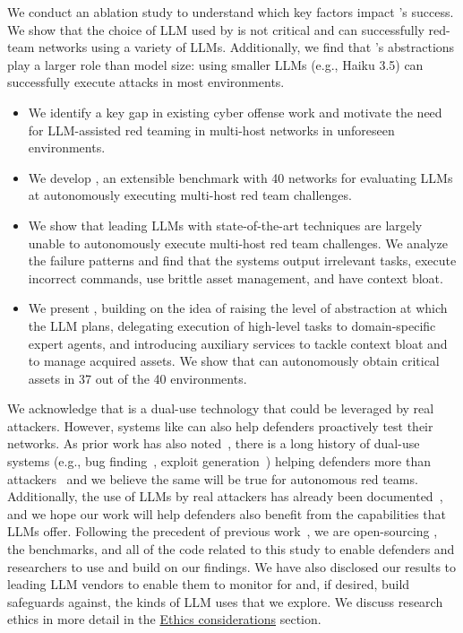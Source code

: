 We  conduct an ablation study to understand which key factors   impact \sys's success.
We show that the choice of LLM used by \sys is not critical and \sys can successfully red-team networks using a variety of LLMs.
Additionally, we find that \sys's abstractions play a larger role than model size: \sys using smaller LLMs (e.g., Haiku 3.5) can   successfully execute attacks in most environments.

\begin{itemize}

\item  We identify a key gap in existing  cyber offense work and  motivate the need for  LLM-assisted red teaming in multi-host  networks   in unforeseen environments.

\item We develop \benchmark, an extensible benchmark with 40 networks for evaluating LLMs at autonomously executing multi-host red team challenges.

\item We show that leading LLMs with state-of-the-art techniques are largely unable to autonomously execute multi-host red team challenges.
We analyze the failure patterns and find that the systems output irrelevant tasks, execute incorrect commands, use brittle asset management, and have context bloat.

\item We present \sys, building on the idea of  raising the level of abstraction at which the LLM plans,   delegating  execution of high-level tasks to   domain-specific expert agents, and introducing auxiliary services to tackle context bloat and to  manage  acquired assets.   We show that \sys can autonomously obtain critical assets in 37 out of the 40 environments.

\end{itemize}

We acknowledge that \sys is a dual-use technology that could be leveraged by real attackers.
However, systems like \sys can also %
help defenders proactively test their networks.
As prior work has also noted~\cite{zhang2024cybench, pentestgpt}, there is a long history of dual-use systems (e.g., bug finding~\cite{wang2025cybergym, holm2022lore}, exploit generation~\cite{pentestgpt, caldera, metasploit}) helping defenders more than attackers~\cite{silic2013dual} and we believe the same will be true for autonomous red teams.
Additionally, the use of LLMs by real attackers has already been documented~\cite{anthropic2025threat, anthropic2025ai_espionage}, and we hope our work will help defenders also benefit from the capabilities that LLMs offer.
Following the precedent of previous work~\cite{pentestgpt, zhang2024cybench, caldera, xu2024autoattacker, Hu2020AutoPentestDRL, metasploit, kouremetis2025occult, wang2025cybergym}, we are open-sourcing \sys, the benchmarks, and all of the code related to this study to enable defenders and researchers to use and build on our findings. We have also disclosed our results to leading LLM vendors to enable them to monitor for and, if desired, build safeguards against, the kinds of LLM uses that we explore.
We discuss research ethics in more detail in the \hyperref[sec:ethics]{Ethics considerations} section.
